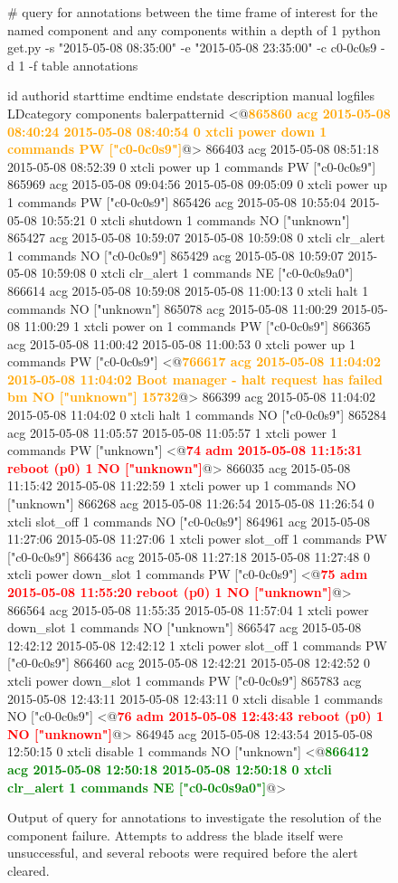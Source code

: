 \begin{figure*}
\begin{annol}
# query for annotations between the time frame of interest for the named component and any components within a depth of 1
python get.py -s "2015-05-08 08:35:00" -e "2015-05-08 23:35:00" -c c0-0c0s9 -d 1 -f table annotations

id	authorid	starttime	endtime		endstate	description	manual	logfiles	LDcategory	components	balerpatternid
<@\textbf{\textcolor{orange}{865860	acg	2015-05-08 08:40:24	2015-05-08 08:40:54	0	xtcli power down	1	commands	PW	["c0-0c0s9"]}}@>
866403	acg	2015-05-08 08:51:18	2015-05-08 08:52:39	0	xtcli power up	1	commands	PW	["c0-0c0s9"]
865969	acg	2015-05-08 09:04:56	2015-05-08 09:05:09	0	xtcli power up	1	commands	PW	["c0-0c0s9"]
865426	acg	2015-05-08 10:55:04	2015-05-08 10:55:21	0	xtcli shutdown	1	commands	NO	["unknown"]
865427	acg	2015-05-08 10:59:07	2015-05-08 10:59:08	0	xtcli clr_alert	1	commands	NO	["c0-0c0s9"]
865429	acg	2015-05-08 10:59:07	2015-05-08 10:59:08	0	xtcli clr_alert	1	commands	NE	["c0-0c0s9a0"]
866614	acg	2015-05-08 10:59:08	2015-05-08 11:00:13	0	xtcli halt	1	commands	NO	["unknown"]
865078	acg	2015-05-08 11:00:29	2015-05-08 11:00:29	1	xtcli power on	1	commands	PW	["c0-0c0s9"]
866365	acg	2015-05-08 11:00:42	2015-05-08 11:00:53	0	xtcli power up	1	commands	PW	["c0-0c0s9"]
<@\textbf{\textcolor{orange}{766617	acg	2015-05-08 11:04:02	2015-05-08 11:04:02		Boot manager - halt request has failed		bm	NO	["unknown"]	15732}}@>
866399	acg	2015-05-08 11:04:02	2015-05-08 11:04:02	0	xtcli halt	1	commands	NO	["c0-0c0s9"]
865284	acg	2015-05-08 11:05:57	2015-05-08 11:05:57	1	xtcli power	1	commands	PW	["unknown"]
<@\textbf{\textcolor{red}{74	adm	2015-05-08 11:15:31		reboot (p0)	1			NO	["unknown"]}}@>
866035	acg	2015-05-08 11:15:42	2015-05-08 11:22:59	1	xtcli power up	1	commands	NO	["unknown"]
866268	acg	2015-05-08 11:26:54	2015-05-08 11:26:54	0	xtcli slot_off	1	commands	NO	["c0-0c0s9"]
864961	acg	2015-05-08 11:27:06	2015-05-08 11:27:06	1	xtcli power slot_off	1	commands	PW	["c0-0c0s9"]
866436	acg	2015-05-08 11:27:18	2015-05-08 11:27:48	0	xtcli power down_slot	1	commands	PW	["c0-0c0s9"]
<@\textbf{\textcolor{red}{75	adm	2015-05-08 11:55:20		reboot (p0)	1		NO	["unknown"]}}@>
866564	acg	2015-05-08 11:55:35	2015-05-08 11:57:04	1	xtcli power down_slot	1	commands	NO	["unknown"]
866547	acg	2015-05-08 12:42:12	2015-05-08 12:42:12	1	xtcli power slot_off	1	commands	PW	["c0-0c0s9"]
866460	acg	2015-05-08 12:42:21	2015-05-08 12:42:52	0	xtcli power down_slot	1	commands	PW	["c0-0c0s9"]
865783	acg	2015-05-08 12:43:11	2015-05-08 12:43:11	0	xtcli disable	1	commands	NO	["c0-0c0s9"]
<@\textbf{\textcolor{red}{76	adm	2015-05-08 12:43:43		reboot (p0)	1			NO	["unknown"]}}@>
864945	acg	2015-05-08 12:43:54	2015-05-08 12:50:15	0	xtcli disable	1	commands	NO	["unknown"]
<@\textbf{\textcolor{green}{866412	acg	2015-05-08 12:50:18	2015-05-08 12:50:18	0	xtcli clr\_alert	1	commands	NE	["c0-0c0s9a0"]}}@>
\end{annol}
\caption{Output of query for annotations to investigate the resolution of the component failure. Attempts to address the blade itself were unsuccessful,
and several reboots were required before the alert cleared.}
\label{f:routeresolution}
\end{figure*}


